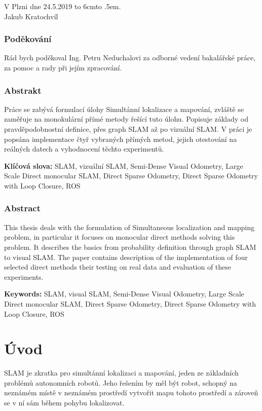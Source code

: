 \documentclass[12pt,a4paper]{report}
\def\dotfill#1{\cleaders\hbox to #1{.}\hfill}
\newcommand\dotline[2][.5em]{\leavevmode\hbox to #2{\dotfill{#1}\hfil}}
\begin{document}
\vspace{2cm}
\noindent
V Plzni dne 24.5.2019 \hfill \dotline{6cm} \\

\hspace*{10.7cm} Jakub Kratochvíl

\vspace{6cm}

\subsection*{Poděkování}

Rád bych poděkoval Ing. Petru Neduchalovi za odborné vedení bakalářské práce, za pomoc a rady při jejím zpracování.

\newpage
\subsection*{Abstrakt}
Práce se zabývá formulací úlohy Simultánní lokalizace a mapování, zvláště se zaměřuje na monokulární přímé metody řešící tuto úlohu. Popisuje základy od pravděpodobnostní definice, přes graph SLAM až po vizuální SLAM. V práci je popsána implementace čtyř vybraných přímých metod, jejich otestování na reálných datech a vyhodnocení těchto experimentů. 

\noindent
\textbf{Klíčová slova:} SLAM, vizuální SLAM, Semi-Dense Visual Odometry, Large Scale Direct monocular SLAM, Direct Sparse Odometry, Direct Sparse Odometry with Loop Closure, ROS

\subsection*{Abstract}
This thesis deals with the formulation of Simultaneous localization and mapping problem, in particular it focuses on monocular direct methods solving this problem. It describes the basics from probability definition through graph SLAM to visual SLAM. The paper contains description of the implementation of four selected direct methods their testing on real data and evaluation of these experiments.

\noindent
\textbf{Keywords:} SLAM, visual SLAM, Semi-Dense Visual Odometry, Large Scale Direct monocular SLAM, Direct Sparse Odometry, Direct Sparse Odometry with Loop Closure, ROS

\newpage
\tableofcontents
\newpage
\fontsize{12pt}{18pt}\selectfont


\chapter{Úvod}
SLAM je zkratka pro simultánní lokalizaci a mapování, jeden ze základních problémů autonomních robotů. Jeho řešením by měl být robot, schopný na neznámém místě v neznámém prostředí vytvořit mapu tohoto prostředí a zároveň se v ní sám během pohybu lokalizovat.
\end{document}
